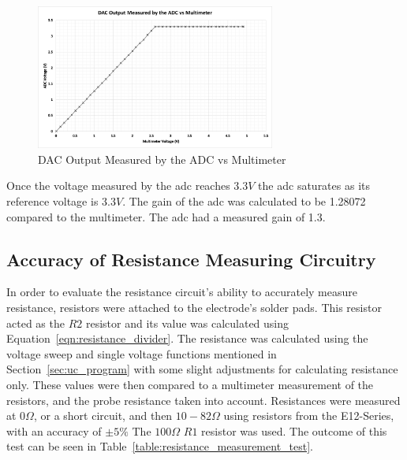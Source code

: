 \begin{figure}[H]
    \centering
    \includegraphics[width=0.7\textwidth]{figures/adc_test.png}
    \caption{DAC Output Measured by the ADC vs Multimeter}
    \label{fig:adc_test}
\end{figure}

Once the voltage measured by the \gls{adc} reaches $3.3V$ the \gls{adc} saturates as its reference voltage is $3.3V$.
The gain of the \gls{adc} was calculated to be 1.28072 compared to the multimeter.
The \gls{adc} had a measured gain of 1.3.

\subsection{Accuracy of Resistance Measuring Circuitry}\label{sec:resistor_measuring_test}
In order to evaluate the resistance circuit's ability to accurately measure resistance, resistors were attached to the electrode's solder pads.
This resistor acted as the $R2$ resistor and its value was calculated using Equation~\ref{eqn:resistance_divider}.
The resistance was calculated using the voltage sweep and single voltage functions mentioned in Section~\ref{sec:uc_program} with some slight adjustments for calculating resistance only.
These values were then compared to a multimeter measurement of the resistors, and the probe resistance taken into account.
Resistances were measured at $0\Omega$, or a short circuit, and then $10-82\Omega$ using resistors from the E12-Series, with an accuracy of $\pm5\%$
The $100\Omega$ $R1$ resistor was used.
The outcome of this test can be seen in Table~\ref{table:resistance_measurement_test}.

